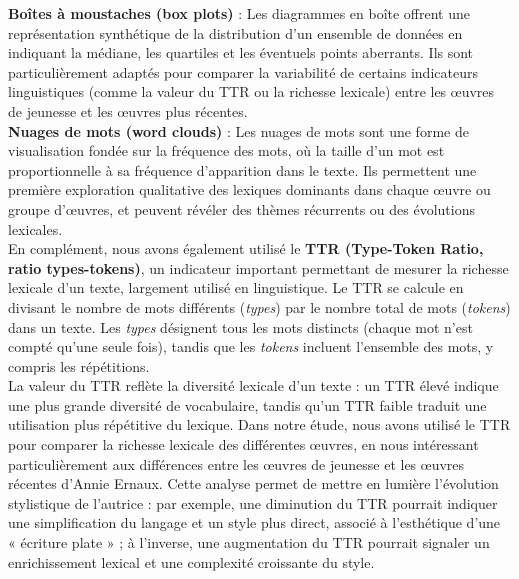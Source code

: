 \textbf{Boîtes à moustaches (box plots)} : Les diagrammes en boîte offrent une représentation synthétique de la distribution d’un ensemble de données en indiquant la médiane, les quartiles et les éventuels points aberrants. Ils sont particulièrement adaptés pour comparer la variabilité de certains indicateurs linguistiques (comme la valeur du TTR ou la richesse lexicale) entre les œuvres de jeunesse et les œuvres plus récentes.\\

\textbf{Nuages de mots (word clouds)} : Les nuages de mots sont une forme de visualisation fondée sur la fréquence des mots, où la taille d’un mot est proportionnelle à sa fréquence d’apparition dans le texte. Ils permettent une première exploration qualitative des lexiques dominants dans chaque œuvre ou groupe d’œuvres, et peuvent révéler des thèmes récurrents ou des évolutions lexicales.\\

En complément, nous avons également utilisé le \textbf{TTR (Type-Token Ratio, ratio types-tokens)}, un indicateur important permettant de mesurer la richesse lexicale d’un texte, largement utilisé en linguistique. Le TTR se calcule en divisant le nombre de mots différents (\textit{types}) par le nombre total de mots (\textit{tokens}) dans un texte. Les \textit{types} désignent tous les mots distincts (chaque mot n’est compté qu’une seule fois), tandis que les \textit{tokens} incluent l’ensemble des mots, y compris les répétitions.\\

La valeur du TTR reflète la diversité lexicale d’un texte : un TTR élevé indique une plus grande diversité de vocabulaire, tandis qu’un TTR faible traduit une utilisation plus répétitive du lexique. Dans notre étude, nous avons utilisé le TTR pour comparer la richesse lexicale des différentes œuvres, en nous intéressant particulièrement aux différences entre les œuvres de jeunesse et les œuvres récentes d’Annie Ernaux. Cette analyse permet de mettre en lumière l’évolution stylistique de l’autrice : par exemple, une diminution du TTR pourrait indiquer une simplification du langage et un style plus direct, associé à l’esthétique d’une « écriture plate » ; à l’inverse, une augmentation du TTR pourrait signaler un enrichissement lexical et une complexité croissante du style.

